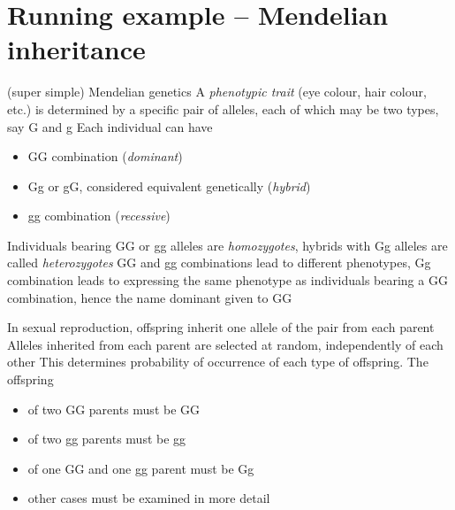 \documentclass[aspectratio=43]{beamer}
\begin{document}
\section{Running example -- Mendelian inheritance}
\begin{frame}{(super simple) Mendelian genetics}
A \emph{phenotypic trait} (eye colour, hair colour, etc.) is determined by a specific pair of alleles, each of which may be two types, say G and g
\vfill
Each individual can have
\begin{itemize}
\item GG combination (\emph{dominant})
\item Gg or gG, considered equivalent genetically (\emph{hybrid})
\item gg combination (\emph{recessive})
\end{itemize}
\vfill
Individuals bearing GG or gg alleles are \emph{homozygotes}, hybrids with Gg alleles are called \emph{heterozygotes}
\vfill
GG and gg combinations lead to different phenotypes, Gg combination leads to expressing the same phenotype as individuals bearing a GG combination, hence the name dominant given to GG
\end{frame}

\begin{frame} 
In sexual reproduction, offspring inherit one allele of the pair from each parent
\vfill
Alleles inherited from each parent are selected at random, independently of each other
\vfill
This determines probability of occurrence of each type of offspring. The offspring
\begin{itemize}
\item of two GG parents must be GG
\item of two gg parents must be gg
\item of one GG and one gg parent must be Gg
\item other cases must be examined in more detail
\end{itemize}
\end{frame}
\end{document}
